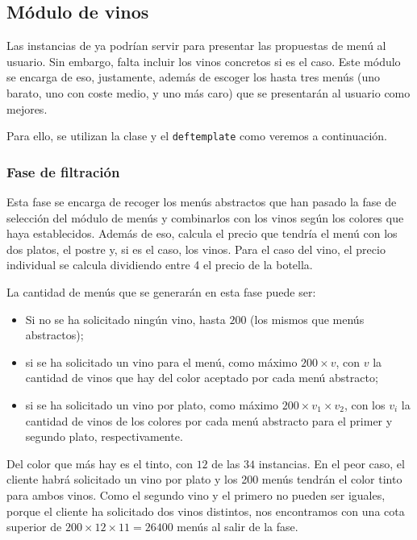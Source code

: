 % 

\subsection{Módulo de vinos}
Las instancias de  ya podrían servir para presentar las
propuestas de menú al usuario. Sin embargo, falta incluir los vinos concretos
si es el caso. Este módulo se encarga de eso, justamente, además de escoger los
hasta tres menús (uno barato, uno con coste medio, y uno más caro) que se
presentarán al usuario como mejores.

Para ello, se utilizan la clase  y el \verb+deftemplate+
 como veremos a continuación.

\subsubsection{Fase de filtración}
Esta fase se encarga de recoger los menús abstractos que han pasado la fase de
selección del módulo de menús y combinarlos con los vinos según los colores que
haya establecidos. Además de eso, calcula el precio que tendría el menú con los
dos platos, el postre y, si es el caso, los vinos. Para el caso del vino, el
precio individual se calcula dividiendo entre 4 el precio de la botella.

La cantidad de menús que se generarán en esta fase puede ser:
\begin{itemize}
\item Si no se ha solicitado ningún vino, hasta $200$ (los mismos que menús
  abstractos);
\item si se ha solicitado un vino para el menú, como máximo $200 \times v$, con
  $v$ la cantidad de vinos que hay del color aceptado por cada menú abstracto;
\item si se ha solicitado un vino por plato, como máximo $200 \times v_1 \times
  v_2$, con los $v_i$ la cantidad de vinos de los colores por cada menú
  abstracto para el primer y segundo plato, respectivamente.
\end{itemize}

Del color que más hay es el tinto, con $12$ de las $34$ instancias. En el peor
caso, el cliente habrá solicitado un vino por plato y los 200 menús tendrán el
color tinto para ambos vinos. Como el segundo vino y el primero no pueden ser
iguales, porque el cliente ha solicitado dos vinos distintos, nos encontramos
con una cota superior de $200 \times 12 \times 11 = 26400$ menús al salir de la
fase.

